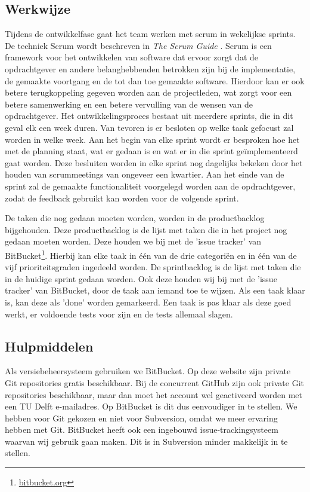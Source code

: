 \subsection{Werkwijze}
Tijdens de ontwikkelfase gaat het team werken met scrum in wekelijkse sprints. De techniek Scrum wordt beschreven in \emph{The Scrum Guide} \cite{schwaber2011}. Scrum is een framework voor het ontwikkelen van software dat ervoor zorgt dat de opdrachtgever en andere belanghebbenden betrokken zijn bij de implementatie, de gemaakte voortgang en de tot dan toe gemaakte software. Hierdoor kan er ook betere terugkoppeling gegeven worden aan de projectleden, wat zorgt voor een betere samenwerking en een betere vervulling van de wensen van de opdrachtgever. Het ontwikkelingsproces bestaat uit meerdere sprints, die in dit geval elk een week duren. Van tevoren is er besloten op welke taak gefocust zal worden in welke week. Aan het begin van elke sprint wordt er besproken hoe het met de planning staat, wat er gedaan is en wat er in die sprint ge\"implementeerd gaat worden. Deze besluiten worden in elke sprint nog dagelijks bekeken door het houden van scrummeetings van ongeveer een kwartier. Aan het einde van de sprint zal de gemaakte functionaliteit voorgelegd worden aan de opdrachtgever, zodat de feedback gebruikt kan worden voor de volgende sprint. 

De taken die nog gedaan moeten worden, worden in de productbacklog bijgehouden. Deze productbacklog is de lijst met taken die in het project nog gedaan moeten worden. Deze houden we bij met de 'issue tracker' van BitBucket\footnote{\href{http://bitbucket.org}{bitbucket.org}}. Hierbij kan elke taak in \'e\'en van de drie categori\"en en in \'e\'en van de vijf prioriteitsgraden ingedeeld worden. De sprintbacklog is de lijst met taken die in de huidige sprint gedaan worden. Ook deze houden wij bij met de 'issue tracker' van BitBucket, door de taak aan iemand toe te wijzen. Als een taak klaar is, kan deze als 'done' worden gemarkeerd. Een taak is pas klaar als deze goed werkt, er voldoende tests voor zijn en de tests allemaal slagen.

\subsection{Hulpmiddelen}
Als versiebeheersysteem gebruiken we BitBucket. Op deze website zijn private Git repositories gratis beschikbaar. Bij de concurrent GitHub zijn ook private Git repositories beschikbaar, maar dan moet het account wel geactiveerd worden met een TU Delft e-mailadres. Op BitBucket is dit dus eenvoudiger in te stellen. We hebben voor Git gekozen en niet voor Subversion, omdat we meer ervaring hebben met Git. BitBucket heeft ook een ingebouwd issue-trackingsysteem waarvan wij gebruik gaan maken. Dit is in Subversion minder makkelijk in te stellen.

